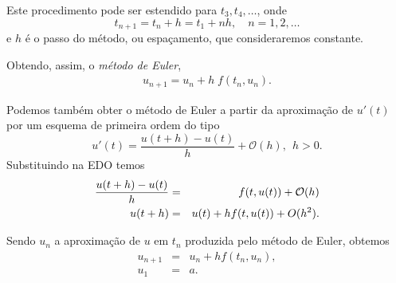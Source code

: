 Este procedimento pode ser estendido para $t_3,t_4,\ldots $, onde
$$ t_{n+1}=t_n + h=t_1+n h, \quad  n=1,2,\ldots $$
e $h$ é o passo do método, ou espaçamento, que consideraremos constante.

Obtendo, assim, o \emph{método de Euler},
\begin{eqnarray}\label{euler}
u_{n+1}=u_n + h\;f(t_n,u_n).
\end{eqnarray}


Podemos também  obter o método de Euler a partir da aproximação de $u'(t)$ por um esquema de primeira ordem do tipo
$$u'(t)=\frac{u(t+h)-u(t)}{h}+\mathcal{O}(h),~~ h>0.$$
Substituindo na EDO temos
\begin{eqnarray}
\frac{u(t+h)-u(t)}{h}&=&f(t,u(t))+\mathcal{O}(h)\\
u(t+h)&=&u(t)+hf(t,u(t))+O(h^2).{\label{erro_local}}
\end{eqnarray}

Sendo $u_n$ a aproximação de $u$ em $t_n$ produzida pelo método de Euler, obtemos
\begin{eqnarray}\label{PVI_EULER}
u_{n+1}&=&u_n+hf(t_n,u_n),\\
u_1    &=&a.
\end{eqnarray}




